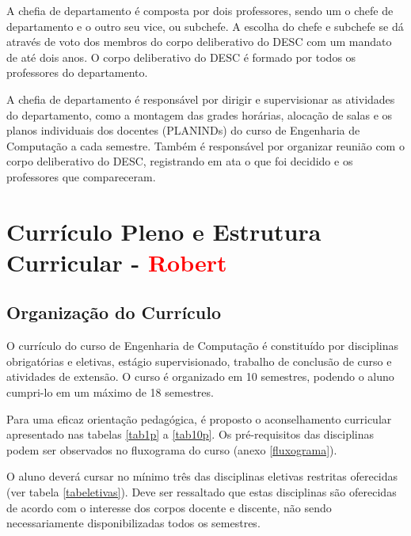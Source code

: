 A chefia de departamento é composta por dois professores, sendo um o chefe de departamento e o outro seu vice, ou subchefe. A escolha do chefe e subchefe se dá através de voto dos membros do corpo deliberativo do DESC com um mandato de até dois anos. O corpo deliberativo do DESC é formado por todos os professores do departamento.



A chefia de departamento é responsável por dirigir e supervisionar as atividades do departamento, como a montagem das grades horárias, alocação de salas e os planos individuais dos docentes (PLANINDs) do curso de Engenharia de Computação a cada semestre. Também é responsável por organizar reunião com o corpo deliberativo do DESC, registrando em ata o que foi decidido e os professores que compareceram.




\section{Currículo Pleno e Estrutura Curricular - \textcolor{red}{Robert}}

\subsection{Organização do Currículo}

O currículo do curso de Engenharia de Computação é constituído por disciplinas obrigatórias e eletivas, estágio supervisionado, trabalho de conclusão de curso e atividades de extensão. O curso é organizado em 10 semestres, podendo o aluno cumpri-lo em um máximo de 18 semestres.

Para uma eficaz orientação pedagógica, é proposto o aconselhamento curricular apresentado nas tabelas \ref{tab1p} a \ref{tab10p}. Os pré-requisitos das disciplinas podem ser observados no fluxograma do curso (anexo \ref{fluxograma}).

O aluno deverá cursar no mínimo três das disciplinas eletivas restritas oferecidas (ver tabela \ref{tabeletivas}). Deve ser
ressaltado que estas disciplinas são oferecidas de acordo com o interesse dos corpos
docente e discente, não sendo necessariamente disponibilizadas todos os semestres.

